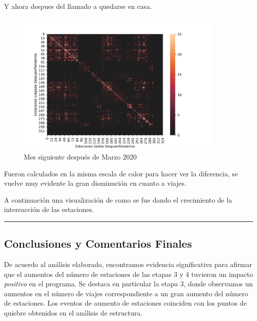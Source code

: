 \documentclass[
]{article}
\begin{document}
Y ahora despues del llamado a quedarse en casa.

\begin{figure}
\centering
\includegraphics[width=10cm]{../plots/resultsDespuesPandemia.png}
\caption{Mes siguiente después de Marzo 2020}
\end{figure}

Fueron calculados en la misma escala de calor para hacer ver la
diferencia, se vuelve muy evidente la gran disminución en cuanto a
viajes.

A continuación una visualización de como se fue dando el crecimiento de
la intereacción de las estaciones.


\begin{center}\rule{0.5\linewidth}{0.5pt}\end{center}


\newpage

\hypertarget{conclusiones-y-comentarios-finales}{%
\subsection{Conclusiones y Comentarios
Finales}\label{conclusiones-y-comentarios-finales}}

  De acuerdo al análisis elaborado, encontramos evidencia significativa para afirmar que el aumentos del número de
  estaciones de las etapas 3 y 4 tuvieron un impacto \emph{positivo} en el
  programa. Se destaca en particular la etapa 3, donde observamos un aumentos en el número de viajes correspondiente a un gran aumento del número de estaciones. Los eventos de aumento de estaciones coinciden con los puntos de quiebre obtenidos en el análisis de estructura.\\
\end{document}
